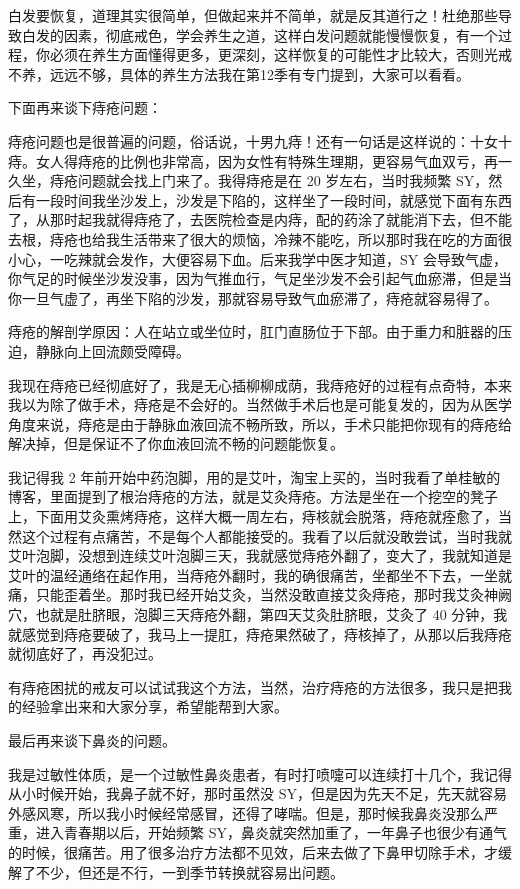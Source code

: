 \documentclass[fontset=founder]{ctexart}
\begin{document}
白发要恢复，道理其实很简单，但做起来并不简单，就是反其道行之！杜绝那些导致白发的因素，彻底戒色，学会养生之道，这样白发问题就能慢慢恢复，有一个过程，你必须在养生方面懂得更多，更深刻，这样恢复的可能性才比较大，否则光戒不养，远远不够，具体的养生方法我在第12季有专门提到，大家可以看看。

下面再来谈下痔疮问题：

痔疮问题也是很普遍的问题，俗话说，十男九痔！还有一句话是这样说的：十女十痔。女人得痔疮的比例也非常高，因为女性有特殊生理期，更容易气血双亏，再一久坐，痔疮问题就会找上门来了。我得痔疮是在 20 岁左右，当时我频繁 SY，然后有一段时间我坐沙发上，沙发是下陷的，这样坐了一段时间，就感觉下面有东西了，从那时起我就得痔疮了，去医院检查是内痔，配的药涂了就能消下去，但不能去根，痔疮也给我生活带来了很大的烦恼，冷辣不能吃，所以那时我在吃的方面很小心，一吃辣就会发作，大便容易下血。后来我学中医才知道，SY 会导致气虚，你气足的时候坐沙发没事，因为气推血行，气足坐沙发不会引起气血瘀滞，但是当你一旦气虚了，再坐下陷的沙发，那就容易导致气血瘀滞了，痔疮就容易得了。

痔疮的解剖学原因：人在站立或坐位时，肛门直肠位于下部。由于重力和脏器的压迫，静脉向上回流颇受障碍。

我现在痔疮已经彻底好了，我是无心插柳柳成荫，我痔疮好的过程有点奇特，本来我以为除了做手术，痔疮是不会好的。当然做手术后也是可能复发的，因为从医学角度来说，痔疮是由于静脉血液回流不畅所致，所以，手术只能把你现有的痔疮给解决掉，但是保证不了你血液回流不畅的问题能恢复。

我记得我 2 年前开始中药泡脚，用的是艾叶，淘宝上买的，当时我看了单桂敏的博客，里面提到了根治痔疮的方法，就是艾灸痔疮。方法是坐在一个挖空的凳子上，下面用艾灸熏烤痔疮，这样大概一周左右，痔核就会脱落，痔疮就痊愈了，当然这个过程有点痛苦，不是每个人都能接受的。我看了以后就没敢尝试，当时我就艾叶泡脚，没想到连续艾叶泡脚三天，我就感觉痔疮外翻了，变大了，我就知道是艾叶的温经通络在起作用，当痔疮外翻时，我的确很痛苦，坐都坐不下去，一坐就痛，只能歪着坐。那时我已经开始艾灸，当然没敢直接艾灸痔疮，那时我艾灸神阙穴，也就是肚脐眼，泡脚三天痔疮外翻，第四天艾灸肚脐眼，艾灸了 40 分钟，我就感觉到痔疮要破了，我马上一提肛，痔疮果然破了，痔核掉了，从那以后我痔疮就彻底好了，再没犯过。

有痔疮困扰的戒友可以试试我这个方法，当然，治疗痔疮的方法很多，我只是把我的经验拿出来和大家分享，希望能帮到大家。

最后再来谈下鼻炎的问题。

我是过敏性体质，是一个过敏性鼻炎患者，有时打喷嚏可以连续打十几个，我记得从小时候开始，我鼻子就不好，那时虽然没 SY，但是因为先天不足，先天就容易外感风寒，所以我小时候经常感冒，还得了哮喘。但是，那时候我鼻炎没那么严重，进入青春期以后，开始频繁 SY，鼻炎就突然加重了，一年鼻子也很少有通气的时候，很痛苦。用了很多治疗方法都不见效，后来去做了下鼻甲切除手术，才缓解了不少，但还是不行，一到季节转换就容易出问题。
\end{document}
